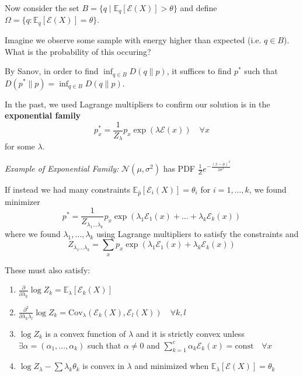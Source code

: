 \documentclass[12pt]{article}
\renewcommand{\hat}[1]{\widehat{#1}}
\newcommand{\E}{\mathbb{E}}
\newcommand{\Ec}{\mathcal{E}}
\newcommand*{\tbf}[1]{\ifmmode\mathbf{#1}\else\textbf{#1}\fi}
\begin{document}
Now consider the set $B = \{q \; | \; \E_q [\Ec(X)] > \theta\}$ and define $\Omega = \{q: \E_q [\Ec(X)] = \theta\}$.

\begin{center}
\end{center}
Imagine we observe some sample with energy higher than expected (i.e. $q \in B$). What is the probability of this occuring?

By Sanov, in order to find $\inf_{q \in B} D(q \parallel p)$, it suffices to find $p^*$ such that $D(p^* \parallel p) = \inf_{q \in B} D(q \parallel p)$.

In the past, we used Lagrange multipliers to confirm our solution is in the \tbf{exponential family}
\[p_x^* = \frac{1}{Z_{\lambda}} p_x \exp(\lambda \Ec(x)) \quad \forall x\]
for some $\lambda$.

\emph{Example of Exponential Family:} $\mathcal{N}(\mu, \sigma^2)$ has PDF $\frac{1}{Z} e^{-\frac{(x- \mu)^2}{2\sigma^2}}$

If instead we had many constraints $\E_{\hat p} [\Ec_i(X)] = \theta_i$ for $i = 1, \dots, k$, we found minimizer
\[p^* = \frac{1}{Z_{\lambda_1 \dots \lambda_k}} p_x \exp(\lambda_1 \Ec_1(x) + \dots + \lambda_k \Ec_k(x))\]
where we found $\lambda_1, \dots, \lambda_k$ using Lagrange multipliers to satisfy the constraints and
\[Z_{\lambda_1\dots \lambda_k} = \sum_x p_x \exp(\lambda_1 \Ec_1(x) + \lambda_k \Ec_k(x))\]

These must also satisfy:
\begin{enumerate}
    \item $\frac{\partial}{\partial \lambda_k} \log Z_k = \E_{\lambda}[\Ec_k(X)]$
    \item $\frac{\partial^2}{\partial \lambda_k \lambda_l} \log Z_k = \text{Cov}_{\lambda}(\Ec_k(X), \Ec_l(X)) \quad \forall k, l$
    \item $\log Z_k$ is a convex function of $\lambda$ and it is strictly convex unless $\exists \alpha = (\alpha_1, \dots, \alpha_k)$ such that $\alpha \neq 0$ and $\sum_{k=1}^c \alpha_k \Ec_k(x) = \text{const} \quad \forall x$
    \item $\log Z_{\lambda} - \sum \lambda_k \theta_k$ is convex in $\lambda$ and minimized when $\E_{\lambda}[\Ec(X)] =\theta_k$
\end{enumerate}
\end{document}
